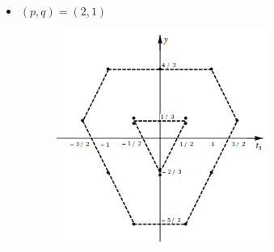 \documentclass[12pt,a4paper]{article}
\theoremstyle{definition}
\numberwithin{equation}{section}
\begin{document}
\begin{itemize}
\begin{figure}[h]
\end{figure}
\pagebreak
\item $(p,q)=(2,1)$
\begin{figure}[h]
\centering
\includegraphics[width=200pt,keepaspectratio=true]{Addons/21}

\end{figure}

\end{itemize}
\end{document}
